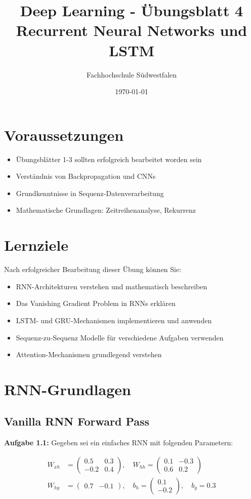 \documentclass[12pt,a4paper]{article}
\title{\textbf{Deep Learning - Übungsblatt 4} \\ \large Recurrent Neural Networks und LSTM}
\author{Fachhochschule Südwestfalen}
\date{\today}
\begin{document}
\maketitle

\section*{Voraussetzungen}
\begin{itemize}
    \item Übungsblätter 1-3 sollten erfolgreich bearbeitet worden sein
    \item Verständnis von Backpropagation und CNNs
    \item Grundkenntnisse in Sequenz-Datenverarbeitung
    \item Mathematische Grundlagen: Zeitreihenanalyse, Rekurrenz
\end{itemize}

\section*{Lernziele}
Nach erfolgreicher Bearbeitung dieser Übung können Sie:
\begin{itemize}
    \item RNN-Architekturen verstehen und mathematisch beschreiben
    \item Das Vanishing Gradient Problem in RNNs erklären
    \item LSTM- und GRU-Mechanismen implementieren und anwenden
    \item Sequenz-zu-Sequenz Modelle für verschiedene Aufgaben verwenden
    \item Attention-Mechanismen grundlegend verstehen
\end{itemize}

\section{RNN-Grundlagen}

\subsection{Vanilla RNN Forward Pass}

\textbf{Aufgabe 1.1:} Gegeben sei ein einfaches RNN mit folgenden Parametern:

\begin{align}
W_{xh} &= \begin{pmatrix} 0.5 & 0.3 \\ -0.2 & 0.4 \end{pmatrix}, \quad 
W_{hh} = \begin{pmatrix} 0.1 & -0.3 \\ 0.6 & 0.2 \end{pmatrix} \\
W_{hy} &= \begin{pmatrix} 0.7 & -0.1 \end{pmatrix}, \quad 
b_h = \begin{pmatrix} 0.1 \\ -0.2 \end{pmatrix}, \quad b_y = 0.3
\end{align}
\end{document}
